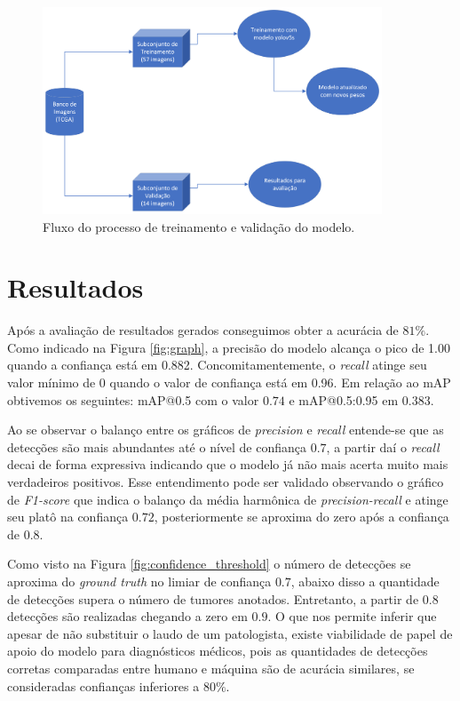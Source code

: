 \documentclass[12pt]{article}
\begin{document}
\begin{figure}[ht]
  \centering
  \includegraphics[width=0.9\textwidth]{images/methods.png}
  \caption{Fluxo do processo de treinamento e validação do modelo.}
  \label{fig:methods}
\end{figure}

\section{Resultados}

Após a avaliação de resultados gerados conseguimos obter a acurácia de $81\%$. Como indicado na Figura \ref{fig:graph}, a precisão do modelo alcança o pico de 1.00 quando a confiança está em 0.882. Concomitamentemente, o {\it recall} atinge seu valor mínimo de 0 quando o valor de confiança está em 0.96. Em relação ao mAP obtivemos os seguintes: mAP@0.5 com o valor $0.74$ e mAP@0.5:0.95 em $0.383$.

Ao se observar o balanço entre os gráficos de {\it precision} e {\it recall} entende-se que as detecções são mais abundantes até o nível de confiança $0.7$, a partir daí o {\it recall} decai de forma expressiva indicando que o modelo já não mais acerta muito mais verdadeiros positivos. Esse entendimento pode ser validado observando o gráfico de {\it F1-score} que indica o balanço da média harmônica de {\it precision-recall} e atinge seu platô na confiança $0.72$, posteriormente se aproxima do zero após a confiança de $0.8$.


Como visto na Figura \ref{fig:confidence_threshold} o número de detecções se aproxima do {\it ground truth} no limiar de confiança $0.7$, abaixo disso a quantidade de detecções supera o número de tumores anotados. Entretanto, a partir de $0.8$ detecções são realizadas chegando a zero em $0.9$. O que nos permite inferir que apesar de não substituir o laudo de um patologista, existe viabilidade de papel de apoio do modelo para diagnósticos médicos, pois as quantidades de detecções corretas comparadas entre humano e máquina são de acurácia similares, se consideradas confianças inferiores a $80\%$.
\end{document}
